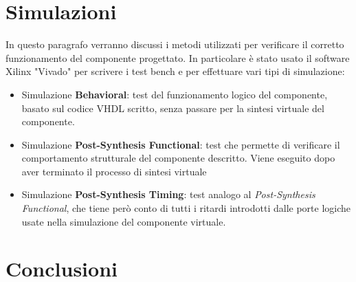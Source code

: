 \documentclass{article}
\begin{document}
\section{Simulazioni}

In questo paragrafo verranno discussi i metodi utilizzati per verificare il corretto funzionamento del componente progettato. In particolare è stato usato il software Xilinx "Vivado" per scrivere i test bench e per effettuare vari tipi di simulazione:

\begin{itemize}

\item Simulazione \textbf{Behavioral}: test del funzionamento logico del componente, basato sul codice VHDL scritto, senza passare per la sintesi virtuale del componente.

\item Simulazione \textbf{Post-Synthesis Functional}: test che permette di verificare il comportamento strutturale del componente descritto. Viene eseguito dopo aver terminato il processo di sintesi virtuale

\item Simulazione \textbf{Post-Synthesis Timing}: test analogo al \textit{Post-Synthesis Functional}, che tiene però conto di tutti i ritardi introdotti dalle porte logiche usate nella simulazione del componente virtuale.

\end{itemize}




\section{Conclusioni}
\end{document}
